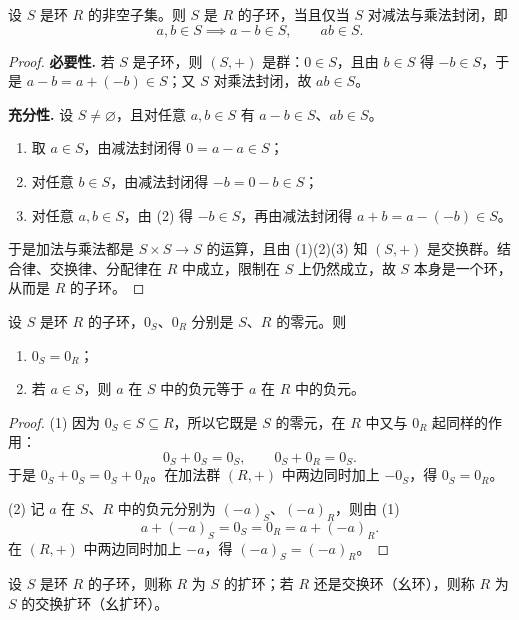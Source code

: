 \begin{theorem}[子环的判定]
设 \(S\) 是环 \(R\) 的非空子集。则 \(S\) 是 \(R\) 的子环，当且仅当 \(S\) 对减法与乘法封闭，即
\[
a,b\in S\implies a-b\in S,\qquad ab\in S .
\]
\end{theorem}

\begin{proof}
\textbf{必要性.} 若 \(S\) 是子环，则 \((S,+)\) 是群：\(0\in S\)，且由 \(b\in S\) 得 \(-b\in S\)，于是 \(a-b=a+(-b)\in S\)；又 \(S\) 对乘法封闭，故 \(ab\in S\)。

\textbf{充分性.} 设 \(S\ne\varnothing\)，且对任意 \(a,b\in S\) 有 \(a-b\in S\)、\(ab\in S\)。
\begin{enumerate}[label=(\arabic*)]
  \item 取 \(a\in S\)，由减法封闭得 \(0=a-a\in S\)；
  \item 对任意 \(b\in S\)，由减法封闭得 \(-b=0-b\in S\)；
  \item 对任意 \(a,b\in S\)，由 (2) 得 \(-b\in S\)，再由减法封闭得 \(a+b=a-(-b)\in S\)。
\end{enumerate}
于是加法与乘法都是 \(S\times S\to S\) 的运算，且由 (1)(2)(3) 知 \((S,+)\) 是交换群。结合律、交换律、分配律在 \(R\) 中成立，限制在 \(S\) 上仍然成立，故 \(S\) 本身是一个环，从而是 \(R\) 的子环。
\end{proof}

\begin{theorem}[子环的零元与负元]
设 \(S\) 是环 \(R\) 的子环，\(0_S\)、\(0_R\) 分别是 \(S\)、\(R\) 的零元。则
\begin{enumerate}[label=(\arabic*)]
  \item \(0_S=0_R\)；
  \item 若 \(a\in S\)，则 \(a\) 在 \(S\) 中的负元等于 \(a\) 在 \(R\) 中的负元。
\end{enumerate}
\end{theorem}

\begin{proof}
(1) 因为 \(0_S\in S\subseteq R\)，所以它既是 \(S\) 的零元，在 \(R\) 中又与 \(0_R\) 起同样的作用：
\[
0_S+0_S=0_S,\qquad 0_S+0_R=0_S .
\]
于是 \(0_S+0_S=0_S+0_R\)。在加法群 \((R,+)\) 中两边同时加上 \(-0_S\)，得 \(0_S=0_R\)。

(2) 记 \(a\) 在 \(S\)、\(R\) 中的负元分别为 \((-a)_S\)、\((-a)_R\)，则由 (1)
\[
a+(-a)_S=0_S=0_R=a+(-a)_R .
\]
在 \((R,+)\) 中两边同时加上 \(-a\)，得 \((-a)_S=(-a)_R\)。
\end{proof}

\begin{definition}[扩环]
设 \(S\) 是环 \(R\) 的子环，则称 \(R\) 为 \(S\) 的扩环；若 \(R\) 还是交换环（幺环），则称 \(R\) 为 \(S\) 的交换扩环（幺扩环）。
\end{definition}

